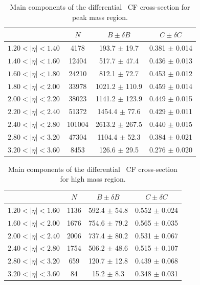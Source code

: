 \begin{table}
\centering
\begin{tabular}{lccc}
\hline
    &   $N$   & $B \pm \delta B$  &  $C \pm \delta C$ \\
\hline
$1.20 < |\eta| <1.40$          & 4178       & 193.7      $\pm$ 19.7 & 0.381      $\pm$ 0.014 \\
$1.40 < |\eta| <1.60$          & 12404      & 517.7      $\pm$ 47.4 & 0.436      $\pm$ 0.013 \\
$1.60 < |\eta| <1.80$          & 24210      & 812.1      $\pm$ 72.7 & 0.453      $\pm$ 0.012 \\
$1.80 < |\eta| <2.00$          & 33978      & 1021.2     $\pm$ 110.9 & 0.459      $\pm$ 0.014 \\
$2.00 < |\eta| <2.20$          & 38023      & 1141.2     $\pm$ 123.9 & 0.449      $\pm$ 0.015 \\
$2.20 < |\eta| <2.40$          & 51372      & 1454.4     $\pm$ 77.6 & 0.429      $\pm$ 0.011 \\
$2.40 < |\eta| <2.80$          & 101004     & 2613.2     $\pm$ 267.5 & 0.440      $\pm$ 0.015 \\
$2.80 < |\eta| <3.20$          & 47304      & 1104.4     $\pm$ 52.3 & 0.384      $\pm$ 0.021 \\
$3.20 < |\eta| <3.60$          & 8453       & 126.6      $\pm$ 29.5 & 0.276      $\pm$ 0.020 \\
\hline
\end{tabular}
\caption{Main components of the differential \Zee\ CF cross-section for peak mass region.}
\label{tab:Zee_NBC_peak}
\end{table}

\begin{table}
\centering
\begin{tabular}{lccc}
\hline
    &   $N$   & $B \pm \delta B$  &  $C \pm \delta C$ \\
\hline
$1.20 < |\eta| <1.60$          & 1136       & 592.4      $\pm$ 54.8 & 0.552      $\pm$ 0.024 \\
$1.60 < |\eta| <2.00$          & 1676       & 754.6      $\pm$ 79.2 & 0.565      $\pm$ 0.035 \\
$2.00 < |\eta| <2.40$          & 2006       & 737.4      $\pm$ 80.2 & 0.531      $\pm$ 0.067 \\
$2.40 < |\eta| <2.80$          & 1754       & 506.2      $\pm$ 48.6 & 0.515      $\pm$ 0.107 \\
$2.80 < |\eta| <3.20$          & 659        & 120.7      $\pm$ 12.8 & 0.439      $\pm$ 0.068 \\
$3.20 < |\eta| <3.60$          & 84         & 15.2       $\pm$ 8.3 & 0.348      $\pm$ 0.031 \\
\hline
\end{tabular}
\caption{Main components of the differential \Zee\ CF cross-section for high mass region.}
\label{tab:Zee_NBC_high}
\end{table}

